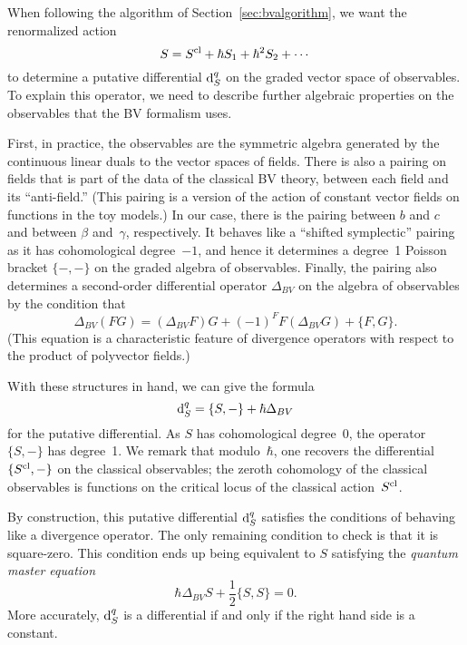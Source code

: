 When following the algorithm of Section~\ref{sec:bvalgorithm},
we want the renormalized action
\[
S = S^{\rm cl} + \hbar S_1 + \hbar^2 S_2 + \cdots
\]
to determine a putative differential ${\rm d}^q_S$ on the graded vector space of observables.
To explain this operator, we need to describe further algebraic properties on the observables
that the BV formalism uses.

First, in practice, the observables are the symmetric algebra generated by the continuous linear duals to the vector spaces of fields.
There is also a pairing on fields that is part of the data of the classical BV theory,
between each field and its ``anti-field.''
(This pairing is a version of the action of constant vector fields on functions in the toy models.)
In our case, there is the pairing between $b$ and $c$ and between $\beta$ and~$\gamma$, respectively.
It behaves like a ``shifted symplectic'' pairing as it has cohomological degree~$-1$,
and hence it determines a degree~1 Poisson bracket $\{-,-\}$ on the graded algebra of observables.
Finally, the pairing also determines a second-order differential operator $\Delta_{BV}$ on the algebra of observables by the condition that
\[
\Delta_{BV}(FG) = (\Delta_{BV}F)G + (-1)^F F(\Delta_{BV}G) + \{F,G\}.
\]
(This equation is a characteristic feature of divergence operators with respect to the product of polyvector fields.)

With these structures in hand, we can give the formula
\[
{\rm d}^q_S=\{S,-\} + \hbar\Delta_{BV}
\]
for the putative differential.
As $S$ has cohomological degree~0, the operator $\{S,-\}$ has degree~1.
We remark that modulo~$\hbar$, one recovers the differential $\{S^{\rm cl},-\}$ on the classical observables;
the zeroth cohomology of the classical observables is functions on the critical locus of the classical action~$S^{\rm cl}$.

By construction, this putative differential ${\rm d}_S^q$ satisfies the conditions of behaving like a divergence operator.
The only remaining condition to check is that it is square-zero.
This condition ends up being equivalent to $S$ satisfying the {\em quantum master equation}
\begin{equation}
\hbar \Delta_{BV} S + \frac{1}{2}\{S,S\} = 0.
\end{equation}
More accurately, ${\rm d}^q_S$ is a differential if and only if the right hand side is a constant.


\subsubsection{}

